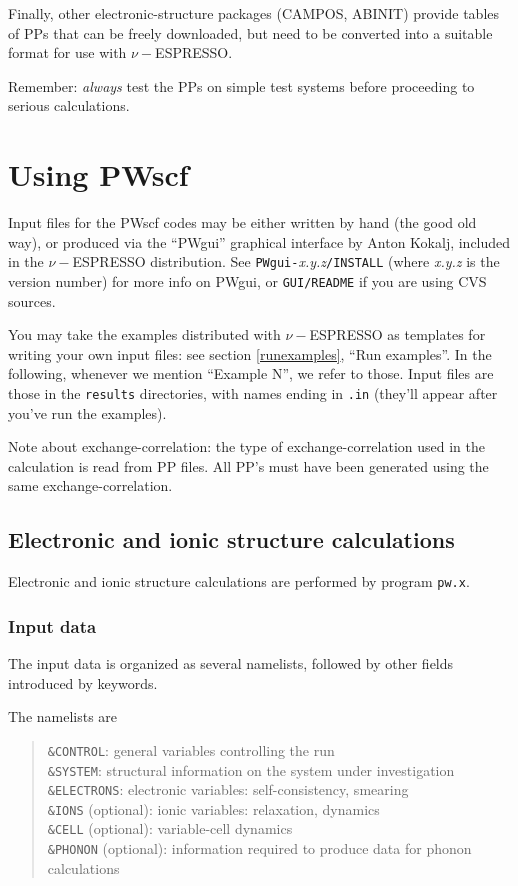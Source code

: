 \documentclass[12pt,a4paper]{article}
\begin{document}
Finally, other electronic-structure packages (CAMPOS, ABINIT)
provide tables of PPs that can be freely downloaded, but need
to be converted into a suitable format for use with $\nu-$ESPRESSO.

Remember: \emph{always} test the PPs on simple test systems before
proceeding to serious calculations.

\clearpage

\section{Using PWscf}

Input files for the PWscf codes may be either written by hand (the
good old way), or produced via the ``PWgui'' graphical interface
by Anton Kokalj, included in the $\nu-$ESPRESSO distribution.
See \texttt{PWgui-}\emph{x.y.z}\texttt{/INSTALL} (where \emph{x.y.z}
is the version number) for more info on PWgui, or \texttt{GUI/README}
if you are using CVS sources.

You may take the examples distributed with $\nu-$ESPRESSO as templates for
writing your own input files: see section \ref{runexamples}, ``Run
examples''.  In the following, whenever we mention ``Example N'', we
refer to those.
Input files are those in the \texttt{results} directories, with names
ending in \texttt{.in} (they'll appear after you've run the examples).

Note about exchange-correlation: the type of exchange-correlation used
in the calculation is read from PP files.
All PP's must have been generated using the same exchange-correlation. 

\subsection{Electronic and ionic structure calculations}

Electronic and ionic structure calculations are performed by program
\texttt{pw.x}.

\subsubsection{Input data}

The input data is organized as several namelists, followed by other
fields introduced by keywords.

The namelists are 
\begin{quote}
  \texttt{\&CONTROL}: general variables controlling the run\\
  \texttt{\&SYSTEM}: structural information on the system under
    investigation\\
  \texttt{\&ELECTRONS}: electronic variables: self-consistency,
    smearing\\
  \texttt{\&IONS} (optional): ionic variables: relaxation,
    dynamics\\
  \texttt{\&CELL} (optional): variable-cell dynamics\\
  \texttt{\&PHONON} (optional): information required to produce
    data for phonon calculations
\end{quote}
\end{document}
